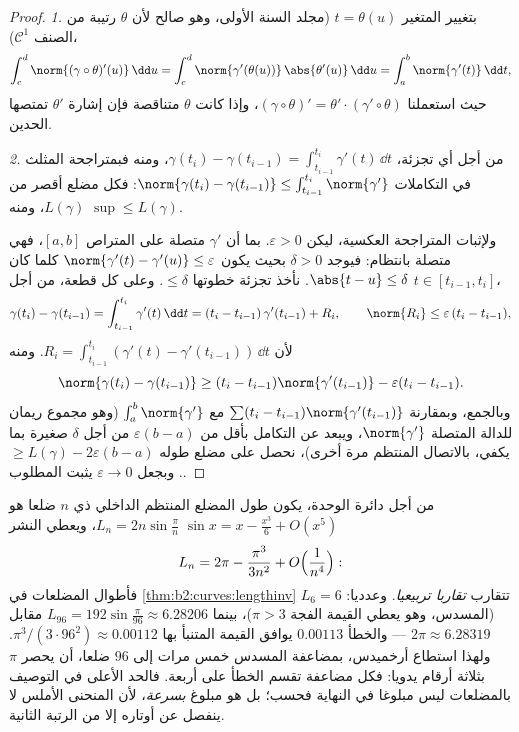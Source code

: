 \begin{proof}
\emph{1.} بتغيير المتغير $t = \theta(u)$ (مجلد السنة الأولى، وهو صالح لأن
$\theta$ رتيبة من الصنف $\mathcal{C}^1$)،
\[
\int_c^d \norm{(\gamma\circ\theta)'(u)}\,\dd u
= \int_c^d \norm{\gamma'(\theta(u))}\,\abs{\theta'(u)}\,\dd u
= \int_a^b \norm{\gamma'(t)}\,\dd t ,
\]
حيث استعملنا $(\gamma\circ\theta)' = \theta'\cdot
(\gamma'\circ\theta)$، وإذا كانت $\theta$ متناقصة فإن إشارة $\theta'$ تمتصها
 الحدين.

\emph{2.} من أجل أي تجزئة، $\gamma(t_i) - \gamma(t_{i-1}) =
\int_{t_{i-1}}^{t_i}\gamma'(t)\,\dd t$، ومنه فبمتراجحة المثلث في التكاملات
$\norm{\gamma(t_i) - \gamma(t_{i-1})}
\leq \int_{t_{i-1}}^{t_i}\norm{\gamma'}$: فكل مضلع أقصر من $L(\gamma)$، ومنه $\sup \leq L(\gamma)$.

ولإثبات المتراجحة العكسية، ليكن $\varepsilon > 0$. بما أن $\gamma'$ متصلة على
المتراص $[a,b]$، فهي متصلة بانتظام: فيوجد $\delta > 0$ بحيث يكون $\norm{\gamma'(t) - \gamma'(u)} \leq
\varepsilon$
كلما كان $\abs{t - u} \leq \delta$. نأخذ تجزئة خطوتها $\leq \delta$. وعلى كل قطعة، من أجل
$t \in [t_{i-1}, t_i]$،
\[
\gamma(t_i) - \gamma(t_{i-1})
= \int_{t_{i-1}}^{t_i}\gamma'(t)\,\dd t
= (t_i - t_{i-1})\,\gamma'(t_{i-1}) + R_i,
\qquad
\norm{R_i} \leq \varepsilon\,(t_i - t_{i-1}),
\]
لأن $R_i = \int_{t_{i-1}}^{t_i}(\gamma'(t) -
\gamma'(t_{i-1}))\,\dd t$. ومنه
\[
\norm{\gamma(t_i) - \gamma(t_{i-1})}
\geq (t_i - t_{i-1})\norm{\gamma'(t_{i-1})}
- \varepsilon (t_i - t_{i-1}) .
\]
وبالجمع، وبمقارنة $\sum (t_i -
t_{i-1})\norm{\gamma'(t_{i-1})}$ مع $\int_a^b\norm{\gamma'}$ (وهو مجموع ريمان للدالة المتصلة
$\norm{\gamma'}$، ويبعد عن التكامل بأقل من $\varepsilon(b - a)$ من أجل $\delta$ صغيرة بما يكفي،
بالاتصال المنتظم مرة أخرى)، نحصل على مضلع طوله $\geq
L(\gamma) - 2\varepsilon(b - a)$. وبجعل
$\varepsilon \to 0$ يثبت المطلوب.
\end{proof}

\begin{example}\label{ex:b2:curves:archimedes}
من أجل دائرة الوحدة، يكون طول المضلع المنتظم الداخلي ذي $n$ ضلعا
هو $L_n = 2n\sin\frac\pi n$، ويعطي النشر $\sin x = x -
\frac{x^3}6 + O(x^5)$
\[
L_n = 2\pi - \frac{\pi^3}{3n^2} + O\Bigl(\frac1{n^4}\Bigr) :
\]
فأطوال المضلعات في \cref{thm:b2:curves:lengthinv} تتقارب \emph{تقاربا تربيعيا}. وعدديا:
$L_6 = 6$ (المسدس، وهو يعطي القيمة الفجة $\pi > 3$)، بينما $L_{96} =
192\sin\frac{\pi}{96} \approx 6.28206$ مقابل
$2\pi \approx
6.28319$ --- والخطأ $0.00113$ يوافق القيمة المتنبأ بها $\pi^3/(3\cdot96^2) \approx 0.00112$. ولهذا استطاع
أرخميدس، بمضاعفة المسدس خمس مرات إلى $96$ ضلعا، أن يحصر $\pi$
بثلاثة أرقام يدويا: فكل مضاعفة تقسم الخطأ على أربعة. فالحد الأعلى في
التوصيف بالمضلعات ليس مبلوغا في النهاية فحسب؛ بل هو مبلوغ
\emph{بسرعة}، لأن المنحنى الأملس لا ينفصل عن أوتاره إلا من الرتبة
الثانية.
\end{example}

